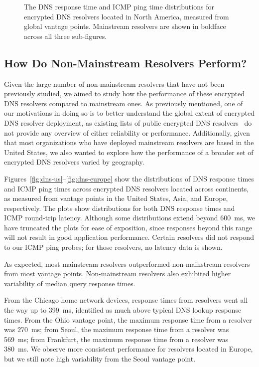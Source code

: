 \begin{figure}[t!]
\begin{minipage}{1.35\textwidth}
    \caption{The DNS response time and ICMP ping time distributions for
    encrypted DNS resolvers located in North America, measured from global vantage points.
    Mainstream resolvers are shown in boldface across all three
    sub-figures.}
\label{fig:dns-NA}
\end{minipage}
\end{figure}

\subsection{How Do Non-Mainstream Resolvers Perform?}

Given the large number of non-mainstream resolvers that have not been
previously studied, we aimed to study how
the performance of these encrypted DNS resolvers compared to mainstream ones.
As previously mentioned, one of our motivations in doing so is to better
understand the global extent of encrypted DNS resolver deployment, as existing
lists of public encrypted DNS resolvers~\cite{dnscrypt-public-resolvers} do
not provide any overview of either reliability or performance. Additionally,
given that most organizations who have deployed mainstream resolvers are based
in the United States, we also wanted to explore how the performance of a
broader set of encrypted DNS resolvers varied by geography.

Figures~\ref{fig:dns-us}--\ref{fig:dns-europe} show the distributions of DNS
response times and ICMP ping times across encrypted DNS resolvers located across continents, as measured
from vantage points in the United States, Asia, and Europe, respectively. The
plots show distributions for both DNS response times and ICMP round-trip latency. 
Although some distributions extend beyond 600~ms, we have truncated the plots
for ease of exposition, since responses beyond this range will not result in
good application performance.
Certain resolvers did not respond to our ICMP ping probes; for those
resolvers, no latency data is shown.


As expected, most mainstream resolvers outperformed non-mainstream resolvers
from most vantage points.
Non-mainstream resolvers also exhibited higher variability of 
median query response times.  

From the Chicago home network devices, response times from resolvers went all the way up to 
399~ms, identified as much above typical DNS lookup response times.
From the Ohio vantage point, the maximum response time from a resolver was 270~ms; from Seoul,
the maximum response time from a resolver was 569~ms; from Frankfurt, the maximum response time from a resolver was 380~ms. 
We observe more consistent performance for resolvers located in Europe, but we still 
note high variability from the Seoul vantage point. 

